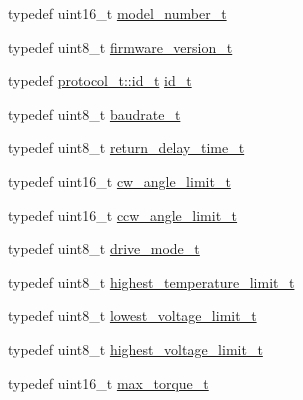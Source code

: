 \begin{DoxyCompactItemize}
\item 
typedef uint16\+\_\+t \hyperlink{structdynamixel_1_1servos_1_1_model_traits_3_01_mx106_01_4_1_1_c_t_aa4bb59a2fdf17f5ebdd048aeb01fa2c3}{model\+\_\+number\+\_\+t}
\item 
typedef uint8\+\_\+t \hyperlink{structdynamixel_1_1servos_1_1_model_traits_3_01_mx106_01_4_1_1_c_t_ab9ed3804f64159aa465d515efd6c5a40}{firmware\+\_\+version\+\_\+t}
\item 
typedef \hyperlink{classdynamixel_1_1protocols_1_1_protocol1_a1d4dfa22b01f80b1876d14f539d52b5c}{protocol\+\_\+t\+::id\+\_\+t} \hyperlink{structdynamixel_1_1servos_1_1_model_traits_3_01_mx106_01_4_1_1_c_t_ad709d5c549b4752da73ff5d82cf9463f}{id\+\_\+t}
\item 
typedef uint8\+\_\+t \hyperlink{structdynamixel_1_1servos_1_1_model_traits_3_01_mx106_01_4_1_1_c_t_a6f978feaf0e9f7a10d159f4d9c95dcf7}{baudrate\+\_\+t}
\item 
typedef uint8\+\_\+t \hyperlink{structdynamixel_1_1servos_1_1_model_traits_3_01_mx106_01_4_1_1_c_t_a009ebd138fd00814e30ea4122c866913}{return\+\_\+delay\+\_\+time\+\_\+t}
\item 
typedef uint16\+\_\+t \hyperlink{structdynamixel_1_1servos_1_1_model_traits_3_01_mx106_01_4_1_1_c_t_ad2b8e731c25af1b5b09f0e0488d353d6}{cw\+\_\+angle\+\_\+limit\+\_\+t}
\item 
typedef uint16\+\_\+t \hyperlink{structdynamixel_1_1servos_1_1_model_traits_3_01_mx106_01_4_1_1_c_t_ad40ab2381192772b0c5f43b3c0b7c4be}{ccw\+\_\+angle\+\_\+limit\+\_\+t}
\item 
typedef uint8\+\_\+t \hyperlink{structdynamixel_1_1servos_1_1_model_traits_3_01_mx106_01_4_1_1_c_t_a34fddef846226bbeacd5ad396f2b7602}{drive\+\_\+mode\+\_\+t}
\item 
typedef uint8\+\_\+t \hyperlink{structdynamixel_1_1servos_1_1_model_traits_3_01_mx106_01_4_1_1_c_t_a3e9a642f51941c737c1d40e561f8dd3c}{highest\+\_\+temperature\+\_\+limit\+\_\+t}
\item 
typedef uint8\+\_\+t \hyperlink{structdynamixel_1_1servos_1_1_model_traits_3_01_mx106_01_4_1_1_c_t_a9b3a85acec659ee87b8dc1d6174e00e5}{lowest\+\_\+voltage\+\_\+limit\+\_\+t}
\item 
typedef uint8\+\_\+t \hyperlink{structdynamixel_1_1servos_1_1_model_traits_3_01_mx106_01_4_1_1_c_t_a97c1a32d526144abc7e6d93873f2ce84}{highest\+\_\+voltage\+\_\+limit\+\_\+t}
\item 
typedef uint16\+\_\+t \hyperlink{structdynamixel_1_1servos_1_1_model_traits_3_01_mx106_01_4_1_1_c_t_a7337b5f84b413241db18e1f795994242}{max\+\_\+torque\+\_\+t}

\end{DoxyCompactItemize}
